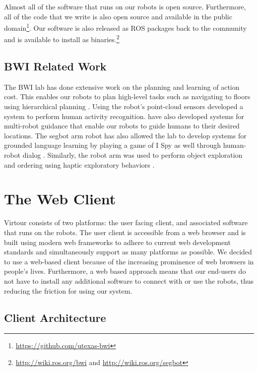 \documentclass[
  oneside,
  11pt, a4paper,
  footinclude=true,
  headinclude=true,
  cleardoublepage=empty
]{article}
\begin{document}
Almost all of the software that runs on our robots is open source. Furthermore,
all of the code that we write is also open source and available in the public
domain\footnote{\url{https://github.com/utexas-bwi}}. Our software is also
released as ROS packages back to the community and is available to install as
binaries.\footnote{\url{http://wiki.ros.org/bwi} and
\url{http://wiki.ros.org/segbot}}

\subsection{BWI Related Work}

The BWI lab has done extensive work on the planning and learning of action
cost. This enables our robots to plan high-level tasks such as navigating to
floors using hierarchical planning \citep{yang2014, khandelwal2014}. Using the
robot's point-cloud sensors \citet{gori2015robot} developed a system to perform
human activity recognition. \citet{khandelwal2015, khandelwal2014multi} have
also developed systems for multi-robot guidance that enable our robots to guide
humans to their desired locations. The segbot arm robot has also allowed the
lab to develop systems for grounded language learning by playing a game of I
Spy \citep{thomason2016} as well through human-robot dialog
\citep{thomason2015learning}. Similarly, the robot arm was used to perform
object exploration and ordering using haptic exploratory behaviors
\citep{sinapov2016}.

\section{The Web Client}\label{sec:client}

Virtour consists of two platforms: the user facing client, and associated
software that runs on the robots. The user client is accessible from a web
browser and is built using modern web frameworks to adhere to current web
development standards and simultaneously support as many platforms as possible.
We decided to use a web-based client because of the increasing prominence of
web browsers in people's lives. Furthermore, a web based approach means that
our end-users do not have to install any additional software to connect with or
use the robots, thus reducing the friction for using our system.

\subsection{Client Architecture}
\end{document}
